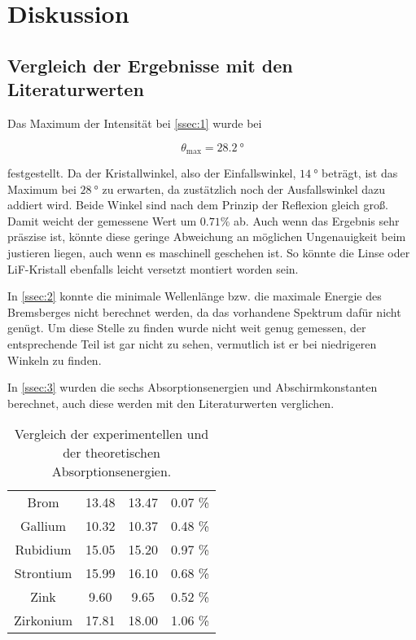 \section{Diskussion}
\label{sec:Diskussion}


\subsection{Vergleich der Ergebnisse mit den Literaturwerten}
\label{ssec:vergleich}

Das Maximum der Intensität bei \autoref{ssec:1} wurde bei

\begin{equation}
    \theta _\text{max} = \SI{28.2}{\degree}
\end{equation}

festgestellt.
Da der Kristallwinkel, also der Einfallswinkel, $\SI{14}{\degree}$ beträgt, ist das Maximum bei $\SI{28}{\degree}$ zu erwarten, da zustätzlich noch der Ausfallswinkel dazu addiert wird.
Beide Winkel sind nach dem Prinzip der Reflexion gleich groß.
Damit weicht der gemessene Wert um $0.71\%$ ab.
Auch wenn das Ergebnis sehr präszise ist, könnte diese geringe Abweichung an möglichen Ungenauigkeit beim justieren liegen, auch wenn es maschinell geschehen ist.
So könnte die Linse oder LiF-Kristall ebenfalls leicht versetzt montiert worden sein.

In \autoref{ssec:2} konnte die minimale Wellenlänge bzw. die maximale Energie des Bremsberges nicht berechnet werden, da das vorhandene Spektrum dafür nicht genügt.
Um diese Stelle zu finden wurde nicht weit genug gemessen, der entsprechende Teil ist gar nicht zu sehen, vermutlich ist er bei niedrigeren Winkeln zu finden.

In \autoref{ssec:3} wurden die sechs Absorptionsenergien und Abschirmkonstanten berechnet, auch diese werden mit den Literaturwerten verglichen.
 
\begin{table}
  \centering
  \caption{Vergleich der experimentellen und der theoretischen Absorptionsenergien. \cite{absorption}}
  \label{tab:e_lit}
  \begin{tabular}{c S[table-format=1.2] S[table-format=1.2] S[table-format=1.2]}
    \toprule 
    &  &  &  \\ 
    \midrule 
    Brom & 13.48 & 13.47 & 0.07 \% \\
    Gallium & 10.32 & 10.37 & 0.48 \% \\
    Rubidium & 15.05 & 15.20 & 0.97 \% \\
    Strontium & 15.99 & 16.10 & 0.68 \% \\
    Zink & 9.60 & 9.65 & 0.52 \% \\
    Zirkonium & 17.81 & 18.00 & 1.06 \% \\
    \bottomrule
  \end{tabular}
\end{table} 

